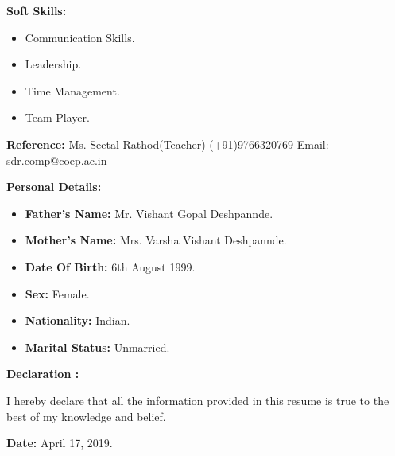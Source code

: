 \documentclass[a4paper,11pt]{article}
\begin{document}
\begin{minipage}[t]{0.4\textwidth}
	\raggedright\smallskip
		\begin{LARGE}
    		\textbf{Soft Skills:}\medskip%
				{\small
					\begin{itemize}
						\item {Communication Skills.}
						\item {Leadership.}
						\item {Time Management.}
						\item {Team Player.}
					\end{itemize}
				}
				\begin{Large}
					\vspace{0.4cm}
					\textbf{Reference:}\medskip\linebreak%
					{\small Ms. Seetal Rathod(Teacher) \linebreak%
					(+91)9766320769\linebreak%
					Email: sdr.comp@coep.ac.in
				}
				\end{Large}
			\end{LARGE}
			\vspace{0.5cm}	

\end{minipage}%
\hspace{0.6cm}
\begin{minipage}[t]{0.6\textwidth}
			\raggedright\smallskip
			\begin{LARGE}
				\textbf{Personal Details:}\medskip%
				{\small
					\begin{itemize}
						\item \textbf{Father's Name:} Mr. Vishant Gopal Deshpannde.
						\item \textbf{Mother's Name:} Mrs. Varsha Vishant Deshpannde.
						\item \textbf{Date Of Birth:} 6th August 1999.
						\item \textbf{Sex:} Female.
						\item \textbf{Nationality:} Indian.
						\item \textbf{Marital Status:} Unmarried.
					\end{itemize}
				}
			\end{LARGE}
			\vspace{0.65cm}

\end{minipage}%

\vspace{0.3cm}


	\begin{Large}
		\textbf{Declaration :}
	\end{Large}

	\begin{large}
	I hereby declare that all the information provided in this resume is true \qquad \qquad to the best of my knowledge and belief.\\
	\end{large}

\vspace{0.3cm}
\begin{Large}
	\textbf{Date:} \large April 17, 2019.
\end{Large}
\end{document}
